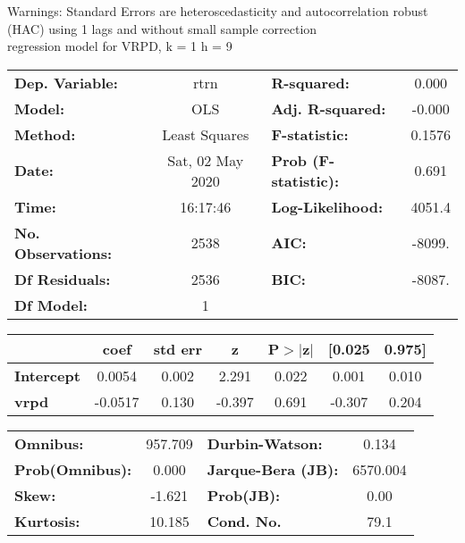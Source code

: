 Warnings: \newline
 [1] Standard Errors are heteroscedasticity and autocorrelation robust (HAC) using 1 lags and without small sample correction\\ 

regression model for VRPD, k = 1 h = 9\begin{center}
\begin{tabular}{lclc}
\toprule
\textbf{Dep. Variable:}    &       rtrn       & \textbf{  R-squared:         } &     0.000   \\
\textbf{Model:}            &       OLS        & \textbf{  Adj. R-squared:    } &    -0.000   \\
\textbf{Method:}           &  Least Squares   & \textbf{  F-statistic:       } &    0.1576   \\
\textbf{Date:}             & Sat, 02 May 2020 & \textbf{  Prob (F-statistic):} &    0.691    \\
\textbf{Time:}             &     16:17:46     & \textbf{  Log-Likelihood:    } &    4051.4   \\
\textbf{No. Observations:} &        2538      & \textbf{  AIC:               } &    -8099.   \\
\textbf{Df Residuals:}     &        2536      & \textbf{  BIC:               } &    -8087.   \\
\textbf{Df Model:}         &           1      & \textbf{                     } &             \\
\bottomrule
\end{tabular}
\begin{tabular}{lcccccc}
                   & \textbf{coef} & \textbf{std err} & \textbf{z} & \textbf{P$> |$z$|$} & \textbf{[0.025} & \textbf{0.975]}  \\
\midrule
\textbf{Intercept} &       0.0054  &        0.002     &     2.291  &         0.022        &        0.001    &        0.010     \\
\textbf{vrpd}      &      -0.0517  &        0.130     &    -0.397  &         0.691        &       -0.307    &        0.204     \\
\bottomrule
\end{tabular}
\begin{tabular}{lclc}
\textbf{Omnibus:}       & 957.709 & \textbf{  Durbin-Watson:     } &    0.134  \\
\textbf{Prob(Omnibus):} &   0.000 & \textbf{  Jarque-Bera (JB):  } & 6570.004  \\
\textbf{Skew:}          &  -1.621 & \textbf{  Prob(JB):          } &     0.00  \\
\textbf{Kurtosis:}      &  10.185 & \textbf{  Cond. No.          } &     79.1  \\
\bottomrule
\end{tabular}
\end{center}


